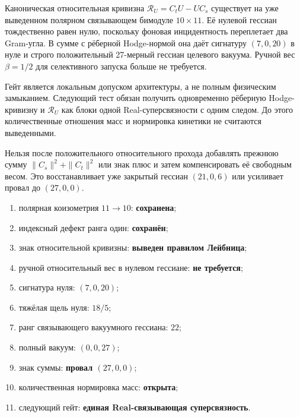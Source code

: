\begin{theorem}
Каноническая относительная кривизна
$\mathcal R_U=C_tU-UC_s$ существует на уже выведенном полярном
связывающем бимодуле $10\times11$. Её нулевой гессиан тождественно равен
нулю, поскольку фоновая инцидентность переплетает два Gram-угла. В сумме с
рёберной Hodge-нормой она даёт сигнатуру $(7,0,20)$ в нуле и строго
положительный 27-мерный гессиан целевого вакуума. Ручной вес $\beta=1/2$
для селективного запуска больше не требуется.
\end{theorem}

\begin{remark}
Гейт является локальным допуском архитектуры, а не полным физическим
замыканием. Следующий тест обязан получить одновременно рёберную Hodge-
кривизну и $\mathcal R_U$ как блоки одной Real-суперсвязности с одним
следом. До этого количественные отношения масс и нормировка кинетики не
считаются выведенными.
\end{remark}

\begin{nogocriterion}
Нельзя после положительного относительного прохода добавлять прежнюю сумму
$\|C_s\|^2+\|C_t\|^2$ или знак плюс и затем компенсировать её свободным
весом. Это восстанавливает уже закрытый гессиан $(21,0,6)$ или усиливает
провал до $(27,0,0)$.
\end{nogocriterion}

\begin{protocol}
\begin{enumerate}
 \item полярная коизометрия $11\to10$: \textbf{сохранена};
 \item индексный дефект ранга один: \textbf{сохранён};
 \item знак относительной кривизны: \textbf{выведен правилом Лейбница};
 \item ручной относительный вес в нулевом гессиане: \textbf{не требуется};
 \item сигнатура нуля: \textbf{$(7,0,20)$};
 \item тяжёлая щель нуля: \textbf{$18/5$};
 \item ранг связывающего вакуумного гессиана: \textbf{$22$};
 \item полный вакуум: \textbf{$(0,0,27)$};
 \item знак суммы: \textbf{провал $(27,0,0)$};
 \item количественная нормировка масс: \textbf{открыта};
 \item следующий гейт: \textbf{единая Real-связывающая суперсвязность}.
\end{enumerate}
\end{protocol}

